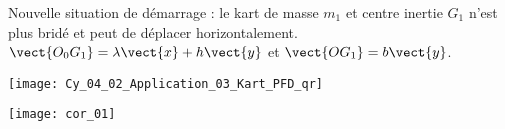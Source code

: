 Nouvelle situation de démarrage : le kart de masse $m_1$ et centre inertie $G_1$ n’est plus bridé et peut de déplacer horizontalement. $\vect{O_0 G_1}=\lambda \vect{x}+h\vect{y}$ et $\vect{OG_1}=b\vect{y}$.





\ifprof
\else
\begin{marginfigure}
\centering
\texttt{[image: Cy\_04\_02\_Application\_03\_Kart\_PFD\_qr]}
\end{marginfigure}
\fi



\fi

\ifprof
\begin{center}
\texttt{[image: cor\_01]}
\end{center}

